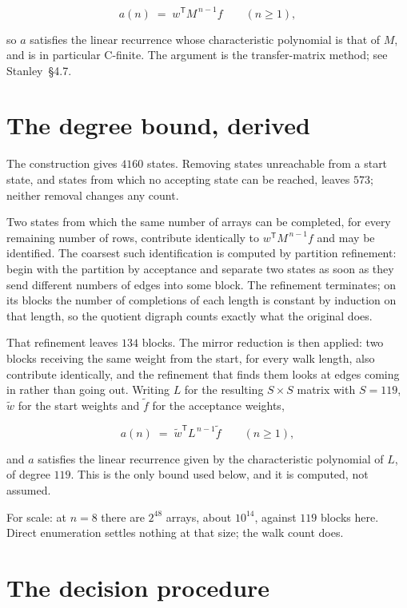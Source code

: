 \documentclass[11pt]{article}
\theoremstyle{definition}
\begin{document}
\[a(n) \;=\; w^{\mathsf T} M^{\,n-1} f \qquad (n \ge 1),\]

so $a$ satisfies the linear recurrence whose characteristic polynomial is that of $M$, and is in particular C-finite. The argument is the transfer-matrix method; see Stanley~\S4.7.

\section{The degree bound, derived}

The construction gives $4160$ states. Removing states unreachable from a start state, and states from which no accepting state can be reached, leaves $573$; neither removal changes any count.

Two states from which the same number of arrays can be completed, for every remaining number of rows, contribute identically to $w^{\mathsf T}M^{\,n-1}f$ and may be identified. The coarsest such identification is computed by partition refinement: begin with the partition by acceptance and separate two states as soon as they send different numbers of edges into some block. The refinement terminates; on its blocks the number of completions of each length is constant by induction on that length, so the quotient digraph counts exactly what the original does.

That refinement leaves $134$ blocks. The mirror reduction is then applied: two blocks receiving the same weight from the start, for every walk length, also contribute identically, and the refinement that finds them looks at edges coming in rather than going out. Writing $L$ for the resulting $S \times S$ matrix with $S = 119$, $\tilde w$ for the start weights and $\tilde f$ for the acceptance weights,

\[a(n) \;=\; \tilde w^{\mathsf T} L^{\,n-1} \tilde f \qquad (n \ge 1),\]

and $a$ satisfies the linear recurrence given by the characteristic polynomial of $L$, of degree $119$. This is the only bound used below, and it is computed, not assumed.

For scale: at $n = 8$ there are $2^{48}$ arrays, about $10^{14}$, against $119$ blocks here. Direct enumeration settles nothing at that size; the walk count does.

\section{The decision procedure}
\end{document}
